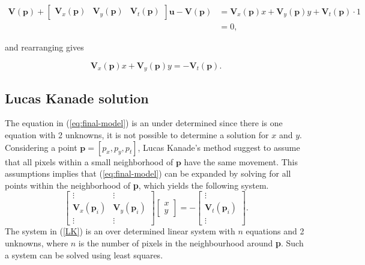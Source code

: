 \documentclass{article}
\begin{document}
\begin{equation}
    \begin{split}
        \boldsymbol{V(p)} + \begin{bmatrix}
        \boldsymbol{V}_x(\boldsymbol{p}) & \boldsymbol{V}_y(\boldsymbol{p}) & \boldsymbol{V}_t(\boldsymbol{p})
        \end{bmatrix} \boldsymbol{u} - \boldsymbol{V(p)} &= \boldsymbol{V}_x(\boldsymbol{p}) x + \boldsymbol{V}_y(\boldsymbol{p}) y + \boldsymbol{V}_t(\boldsymbol{p}) \cdot 1 \\
        &= 0,
    \end{split}
\end{equation}

and rearranging gives

\begin{equation}\label{eq:final-model}
    \boldsymbol{V}_x(\boldsymbol{p}) x + \boldsymbol{V}_y(\boldsymbol{p}) y = -\boldsymbol{V}_t(\boldsymbol{p}).
\end{equation}

\subsection{Lucas Kanade solution}
The equation in (\ref{eq:final-model}) is an under determined since there is one equation with 2 unknowns, it is not possible to determine a solution for $x$ and $y$. Considering a point $\textbf{p}=[p_x,p_y,p_t]$, Lucas Kanade's method suggest to assume that all pixels within a small neighborhood of $\textbf{p}$ have the same movement. This assumptions implies that (\ref{eq:final-model}) can be expanded by solving for all points within the neighborhood of \textbf{p}, which yields the following system.
\begin{equation}\label{LK}
    \begin{bmatrix}
        \vdots & \vdots \\
        \boldsymbol{V}_x(\boldsymbol{p}_i) & \boldsymbol{V}_y(\boldsymbol{p}_i) \\
        \vdots & \vdots
    \end{bmatrix} \begin{bmatrix}
        x \\ y
    \end{bmatrix}
    = - \begin{bmatrix}
        \vdots \\ \boldsymbol{V}_t(\boldsymbol{p}_i) \\ \vdots
    \end{bmatrix}.
\end{equation}
The system in (\ref{LK}) is an over determined linear system with $n$ equations and 2 unknowns, where $n$ is the number of pixels in the neighbourhood around \textbf{p}. Such a system can be solved using least squares.
\end{document}
